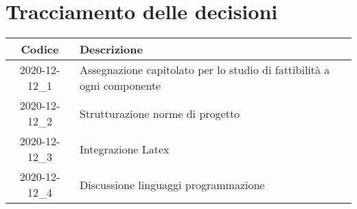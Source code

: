 \section*{Tracciamento delle decisioni}

\begin{center}
	\begin{longtable}{|c|p{12.25cm}|}
	\hline
	\rowcolor{lighter-grayer}
	\textbf{Codice} & \textbf{Descrizione} \\
	\hline
	\endfirsthead

	\hline
	2020-12-12\_1 & Assegnazione capitolato per lo studio di fattibilità a ogni componente \\
	\hline
	2020-12-12\_2 & Strutturazione norme di progetto\\
	\hline
	2020-12-12\_3 & Integrazione Latex\\
	\hline
	2020-12-12\_4 & Discussione linguaggi programmazione\\
	\hline
	\end{longtable}
\end{center}
